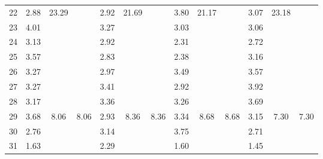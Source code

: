\documentclass[%
 aip,
 jmp,%
 amsmath,amssymb,
 reprint,%
]{revtex4-1}
\begin{document}
\begin{table}
\begin{center}
\begin{tabular}{ |l|| c|c|c| c|c|c| c|c|c| c|c|c|}
22 & 2.88 & \multirow{7}{*}{23.29} &                         & 2.92  & \multirow{7}{*}{21.69} & & 3.80 & \multirow{7}{*}{21.17} & & 3.07 & \multirow{7}{*}{23.18} & \\
23 & 4.01 &                        &                         & 3.27  & & & 3.03 & & & 3.06 & & \\
24 & 3.13 &                        &                         & 2.92  & & & 2.31 & & & 2.72 & & \\
25 & 3.57 &                        &                         & 2.83  & & & 2.38 & & & 3.16 & & \\
26 & 3.27 &                        &                         & 2.97  & & & 3.49 & & & 3.57 & & \\
27 & 3.27 &                        &                         & 3.41  & & & 2.92 & & & 3.92 & & \\
28 & 3.17 &                        &                         & 3.36  & & & 3.26 & & & 3.69 & & \\\hline
29 & 3.68 &  \multirow{3}{*}{8.06} &  \multirow{3}{*}{8.06}  & 2.93  & \multirow{3}{*}{8.36} & \multirow{3}{*}{8.36} & 3.34 & \multirow{3}{*}{8.68} & \multirow{3}{*}{8.68} & 3.15 & \multirow{3}{*}{7.30} & \multirow{3}{*}{7.30} \\
30 & 2.76 &                        &                         & 3.14  & & & 3.75 & & & 2.71 & & \\
31 & 1.63 &                        &                         & 2.29  & & & 1.60 & & & 1.45 & & \\\hline
    \end{tabular}
\end{center}
\label{mes}
\end{table}
\end{document}
